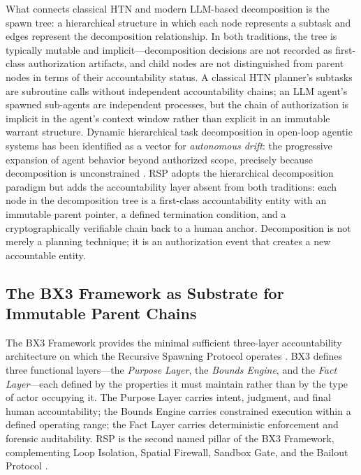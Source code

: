 What connects classical HTN and modern LLM-based decomposition is the spawn tree: a hierarchical structure in which each node represents a subtask and edges represent the decomposition relationship. In both traditions, the tree is typically mutable and implicit---decomposition decisions are not recorded as first-class authorization artifacts, and child nodes are not distinguished from parent nodes in terms of their accountability status. A classical HTN planner's subtasks are subroutine calls without independent accountability chains; an LLM agent's spawned sub-agents are independent processes, but the chain of authorization is implicit in the agent's context window rather than explicit in an immutable warrant structure. Dynamic hierarchical task decomposition in open-loop agentic systems has been identified as a vector for \emph{autonomous drift}: the progressive expansion of agent behavior beyond authorized scope, precisely because decomposition is unconstrained \cite{autoGPT2023}. RSP adopts the hierarchical decomposition paradigm but adds the accountability layer absent from both traditions: each node in the decomposition tree is a first-class accountability entity with an immutable parent pointer, a defined termination condition, and a cryptographically verifiable chain back to a human anchor. Decomposition is not merely a planning technique; it is an authorization event that creates a new accountable entity.

\subsection{The BX3 Framework as Substrate for Immutable Parent Chains}

The BX3 Framework provides the minimal sufficient three-layer accountability architecture on which the Recursive Spawning Protocol operates \cite{bx3-framework,bx3framework2026}. BX3 defines three functional layers---the \textit{Purpose Layer}, the \textit{Bounds Engine}, and the \textit{Fact Layer}---each defined by the properties it must maintain rather than by the type of actor occupying it. The Purpose Layer carries intent, judgment, and final human accountability; the Bounds Engine carries constrained execution within a defined operating range; the Fact Layer carries deterministic enforcement and forensic auditability. RSP is the second named pillar of the BX3 Framework, complementing Loop Isolation, Spatial Firewall, Sandbox Gate, and the Bailout Protocol \cite{bx3-framework,bansal2019}.

